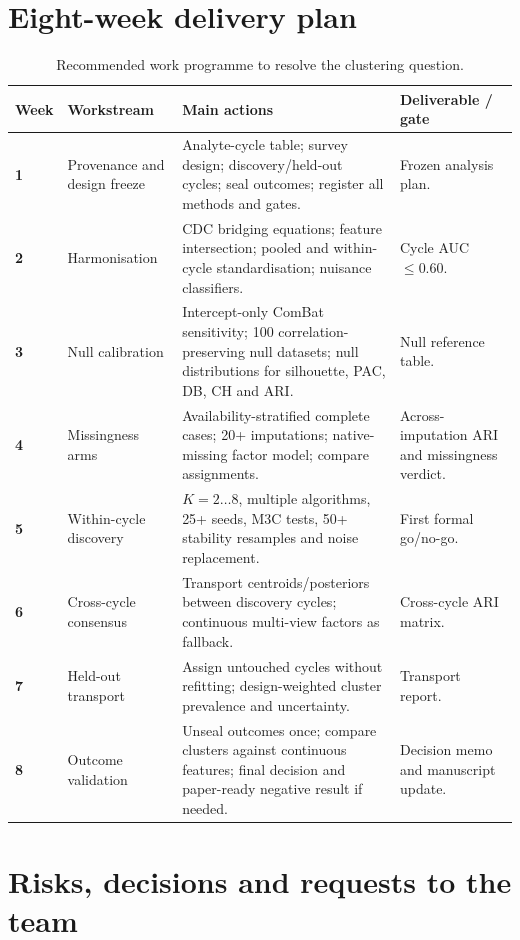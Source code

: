 \documentclass[11pt,a4paper]{article}
\begin{document}
\section{Eight-week delivery plan}

\begin{table}[H]
\centering
\small
\caption{Recommended work programme to resolve the clustering question.}
\begin{tabularx}{\textwidth}{>{\bfseries}p{13mm} p{37mm} X p{31mm}}
\toprule
Week & Workstream & Main actions & Deliverable / gate \\
\midrule
1 & Provenance and design freeze &
Analyte-cycle table; survey design; discovery/held-out cycles; seal outcomes;
register all methods and gates. &
Frozen analysis plan. \\
2 & Harmonisation &
CDC bridging equations; feature intersection; pooled and within-cycle
standardisation; nuisance classifiers. &
Cycle AUC \(\leq 0.60\). \\
3 & Null calibration &
Intercept-only ComBat sensitivity; 100 correlation-preserving null datasets;
null distributions for silhouette, PAC, DB, CH and ARI. &
Null reference table. \\
4 & Missingness arms &
Availability-stratified complete cases; 20+ imputations; native-missing factor
model; compare assignments. &
Across-imputation ARI and missingness verdict. \\
5 & Within-cycle discovery &
\(K=2\ldots8\), multiple algorithms, 25+ seeds, M3C tests, 50+ stability
resamples and noise replacement. &
First formal go/no-go. \\
6 & Cross-cycle consensus &
Transport centroids/posteriors between discovery cycles; continuous multi-view
factors as fallback. &
Cross-cycle ARI matrix. \\
7 & Held-out transport &
Assign untouched cycles without refitting; design-weighted cluster prevalence
and uncertainty. &
Transport report. \\
8 & Outcome validation &
Unseal outcomes once; compare clusters against continuous features; final
decision and paper-ready negative result if needed. &
Decision memo and manuscript update. \\
\bottomrule
\end{tabularx}
\end{table}

\section{Risks, decisions and requests to the team}
\end{document}
